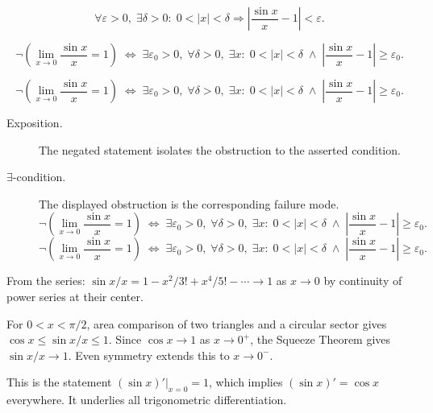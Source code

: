 \begin{remark*}
\[
  \forall\varepsilon > 0,\;
  \exists\delta > 0 :\;
  0 < |x| < \delta \Rightarrow
  \left|\frac{\sin x}{x} - 1\right| < \varepsilon.
\]
\end{remark*}

\begin{remark*}
\[
  \neg\left(\lim_{x\to 0}\frac{\sin x}{x}=1\right)
  \;\iff\;
  \exists\varepsilon_0>0,\;\forall\delta>0,\;\exists x:\;
  0<|x|<\delta \;\wedge\;
  \left|\frac{\sin x}{x}-1\right|\geq\varepsilon_0.
\]
\end{remark*}

\begin{remark*}
\[
\neg\left(\lim_{x\to 0}\frac{\sin x}{x}=1\right)
  \;\iff\;
  \exists\varepsilon_0>0,\;\forall\delta>0,\;\exists x:\;
  0<|x|<\delta \;\wedge\;
  \left|\frac{\sin x}{x}-1\right|\geq\varepsilon_0.
\]
\end{remark*}

\begin{remark*}
\begin{description}
  \item[Exposition.]
  The negated statement isolates the obstruction to the asserted condition.

  \item[\(\exists\)-condition.]
  The displayed obstruction is the corresponding failure mode.
  \[
\neg\left(\lim_{x\to 0}\frac{\sin x}{x}=1\right)
  \;\iff\;
  \exists\varepsilon_0>0,\;\forall\delta>0,\;\exists x:\;
  0<|x|<\delta \;\wedge\;
  \left|\frac{\sin x}{x}-1\right|\geq\varepsilon_0.
  \]
  \[
\neg\left(\lim_{x\to 0}\frac{\sin x}{x}=1\right)
  \;\iff\;
  \exists\varepsilon_0>0,\;\forall\delta>0,\;\exists x:\;
  0<|x|<\delta \;\wedge\;
  \left|\frac{\sin x}{x}-1\right|\geq\varepsilon_0.
  \]
\end{description}
\end{remark*}



\begin{remark*}[Interpretation]
From the series: $\sin x / x = 1 - x^2/3! + x^4/5! - \cdots \to 1$
as $x \to 0$ by continuity of power series at their center.


For $0 < x < \pi/2$, area comparison of two triangles and a circular
sector gives $\cos x \leq \sin x / x \leq 1$. Since $\cos x \to 1$
as $x \to 0^+$, the Squeeze Theorem gives $\sin x / x \to 1$.
Even symmetry extends this to $x \to 0^-$.


This is the statement $(\sin x)'\big|_{x=0} = 1$, which implies
$(\sin x)' = \cos x$ everywhere. It underlies all trigonometric
differentiation.
\end{remark*}

